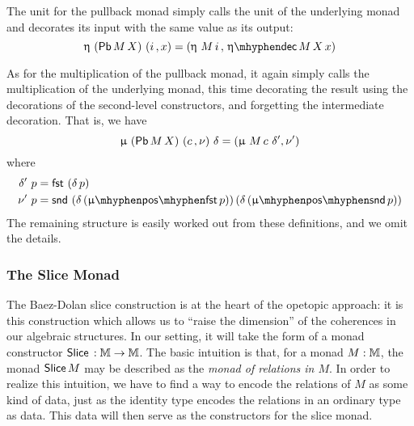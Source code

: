 The unit for the pullback monad simply calls the unit of the
underlying monad and decorates its input with the same value as its
output:
\[ \upeta\ (\Pb M\, X)\ (i \,, x) = (\upeta\ M\, i\, ,\, \etadec M\, X\, x) \]

As for the multiplication of the pullback monad, it again simply calls
the multiplication of the underlying monad, this time decorating the
result using the decorations of the second-level constructors,
and forgetting the intermediate decoration.  That is, we have
\[ \upmu\ (\Pb M\, X)\ (c \,, \nu)\ \delta = (\upmu\ M\, c\ \delta', \nu') \]
where
\begin{align*}
  \delta'\ p &= \fst\, (\delta\, p)\\
  \nu'\ p &= \snd\, (\delta\, (\muposfst p))\, (\delta\, (\mupossnd p))
\end{align*}
The remaining structure is easily worked out from these definitions,
and we omit the details.

\subsubsection{The Slice Monad}
\label{sec:slice-monad}

The Baez-Dolan slice construction is at the heart of the opetopic
approach: it is this construction which allows us to ``raise the
dimension'' of the coherences in our algebraic structures.  In our
setting, it will take the form of a monad constructor
$\mathsf{Slice}\, : \mathbb{M} \to \mathbb{M}$.  The basic intuition is that, for a monad
$M : \mathbb{M}$, the monad $\mathsf{Slice}\, M$ may be described as the \emph{monad of
  relations in $M$}.  In order to realize this intuition, we have to
find a way to encode the relations of $M$ as some kind of data, just
as the identity type encodes the relations in an ordinary type as
data.  This data will then serve as the constructors for the slice
monad.

